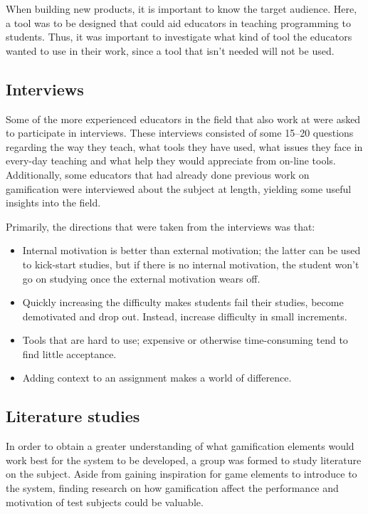 When building new products, it is important to know the target audience. Here, a tool was to be designed that could aid educators in teaching programming to students. Thus, it was important to investigate what kind of tool the educators wanted to use in their work, since a tool that isn't needed will not be used.

\subsection{Interviews}
Some of the more experienced educators in the field that also work at \LTU{} were asked to participate in interviews. These interviews consisted of some 15--20 questions regarding the way they teach, what tools they have used, what issues they face in every-day teaching and what help they would appreciate from on-line tools. Additionally, some educators that had already done previous work on gamification were interviewed about the subject at length, yielding some useful insights into the field.

Primarily, the directions that were taken from the interviews was that:
\begin{itemize}
\item Internal motivation is better than external motivation; the latter can be used to kick-start studies, but if there is no internal motivation, the student won't go on studying once the external motivation wears off.
\item Quickly increasing the difficulty makes students fail their studies, become demotivated and drop out. Instead, increase difficulty in small increments.
\item Tools that are hard to use; expensive or otherwise time-consuming tend to find little acceptance.
\item Adding context to an assignment makes a world of difference.
\end{itemize}

\subsection{Literature studies}
In order to obtain a greater understanding of what gamification elements would work best for the system to be developed, a group was formed to study literature on the subject. Aside from gaining inspiration for game elements to introduce to the system, finding research on how gamification affect the performance and motivation of test subjects could be valuable.

